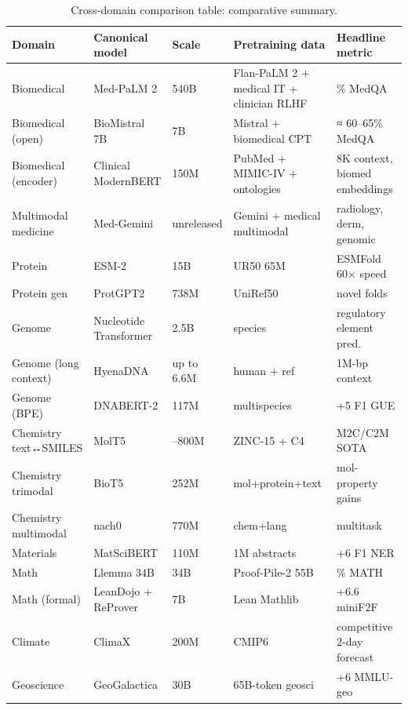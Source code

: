 \documentclass{article}
\begin{document}
\begin{table}[t]
\centering
\caption{Cross-domain comparison table: comparative summary.}
\label{tab:cross-domain-comparison-table}
\begin{tabular}{>{\raggedright\arraybackslash}p{0.1705\linewidth}
  >{\raggedright\arraybackslash}p{0.2093\linewidth}
  >{\raggedright\arraybackslash}p{0.0775\linewidth}
  >{\raggedright\arraybackslash}p{0.3178\linewidth}
  >{\raggedright\arraybackslash}p{0.2248\linewidth}}
\toprule
Domain & Canonical model & Scale & Pretraining data & Headline metric \\
\midrule
Biomedical & Med-PaLM 2 \cite{singhal2025towardexpertlevelm} & 540B & Flan-PaLM 2 + medical IT + clinician RLHF & 86.5\% MedQA \\
Biomedical (open) & BioMistral 7B & 7B & Mistral + biomedical CPT & ≈ 60--65\% MedQA \\
Biomedical (encoder) & Clinical ModernBERT \cite{lee2025arxiv2504039642025} & 150M & PubMed + MIMIC-IV + ontologies & 8K context, biomed embeddings \\
Multimodal medicine & Med-Gemini \cite{yang2024advancingmultimoda} & unreleased & Gemini + medical multimodal & radiology, derm, genomic \\
Protein & ESM-2 \cite{lin2022evolutionaryscalep} & 15B & UR50 65M & ESMFold 60× speed \\
Protein gen & ProtGPT2 \cite{ferruz2022naturecommunicatio} & 738M & UniRef50 & novel folds \\
Genome & Nucleotide Transformer \cite{dallatorre2024nucleotidetransfor} & 2.5B & 850 species & regulatory element pred. \\
Genome (long context) & HyenaDNA \cite{nguyen2023hyenadnalongrangeg} & up to 6.6M & human + ref & 1M-bp context \\
Genome (BPE) & DNABERT-2 \cite{zhou2023arxiv2306150062023} & 117M & multispecies & +5 F1 GUE \\
Chemistry text↔SMILES & MolT5 \cite{edwards2022emnlp2022} & 250--800M & ZINC-15 + C4 & M2C/C2M SOTA \\
Chemistry trimodal & BioT5 \cite{pei2023emnlp2023} & 252M & mol+protein+text & mol-property gains \\
Chemistry multimodal & nach0 \cite{livne2024nach0multimodalnat} & 770M & chem+lang & multitask \\
Materials & MatSciBERT \cite{gupta2022matscibertamateria} & 110M & 1M abstracts & +6 F1 NER \\
Math & Llemma 34B \cite{azerbayev2023llemmaanopenlangua} & 34B & Proof-Pile-2 55B & 25.0\% MATH \\
Math (formal) & LeanDojo + ReProver \cite{yang2023leandojotheorempro} & 7B & Lean Mathlib & +6.6 miniF2F \\
Climate & ClimaX \cite{nguyen2023arxiv2301103432023} & 200M & CMIP6 & competitive 2-day forecast \\
Geoscience & GeoGalactica \cite{lin2023geogalacticaascien} & 30B & 65B-token geosci & +6 MMLU-geo \\
\end{tabular}
\end{table}
\end{document}
